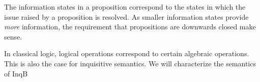 The information states in a proposition correspond to the states in which the issue raised by a proposition is resolved. As smaller information states provide \emph{more} information, the requirement that propositions are downwards closed make sense. 

In classical logic, logical operations correspond to certain algebraic operations. This is also the case for inquisitive semantics. We will characterize the semantics of \textsf{InqB}


